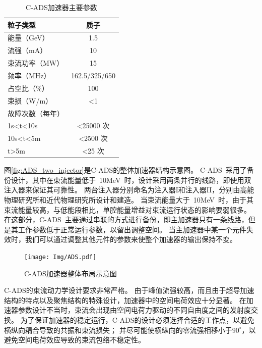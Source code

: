 \begin{table}[!tbh]
  \centering
  \caption{C-ADS加速器主要参数}
  \begin{tabular}{>{\small}lc}
    \hline\hline
    粒子类型              &质子  \\
    \hline
    能量（GeV）           &1.5   \\
    \hline
    流强（mA）            &10    \\
    \hline
    束流功率（MW）        &15    \\
    \hline
    频率（MHz）           &162.5/325/650  \\
    \hline
    占空比（\%）          &100   \\
    \hline
    束损（W/m）           &<1    \\
    \hline
    故障次数（每年）        & \\
    \qquad 1s<t<10s        & <25000 次 \\
    \qquad 10s<t<5m        & <2500 次  \\
    \qquad t>5m            & <25 次   \\
    \hline\hline
  \end{tabular}
  \label{tab:C_ADS_parameter}
\end{table}

图\eqref{fig:ADS_two_injector}是C-ADS的整体加速器结构示意图\cite{zhihuili2011ADS,mengcai2014phdthesis}。
C-ADS~采用了备份设计，其中在束流能量低于~10MeV~时，设计采用两条并行的线路，即使用双注入器来保证其可靠性。
两台注入器分别命名为注入器I和注入器II，分别由高能物理研究所和近代物理研究所设计和建造。
当束流能量大于~10MeV~时，由于其束流能量较高，与低能段相比，单腔能量增益对束流运行状态的影响要弱很多。
在这部分，C-ADS~主要通过串联的方式进行备份，即主加速器只有一条线路，但是其工作参数低于正常运行参数，以留出调整空间。
当主加速器中某一个元件失效时，我们可以通过调整其他元件的参数来使整个加速器的输出保持不变。

\begin{figure}[!tbh]
    \centering
    \texttt{[image: Img/ADS.pdf]}
    \caption{C-ADS加速器整体布局示意图}
    \label{fig:ADS_two_injector}
\end{figure}

C-ADS的束流动力学设计要求非常严格。
由于峰值流强较高，而且由于超导加速结构的特点以及聚焦结构的特殊设计，加速器中的空间电荷效应十分显著。
在加速器参数设计不当时，束流会出现由空间电荷力驱动的不同自由度之间的发射度交换。
为了保证加速器的稳定运行，C-ADS的设计必须选择合适的工作点，以避免横纵向耦合导致的共振和束流损失；
并尽可能使横纵向的零流强相移小于$90^{\circ}$，以避免空间电荷效应导致的束流包络不稳定性\cite{chao2014TOPOPIC}。

